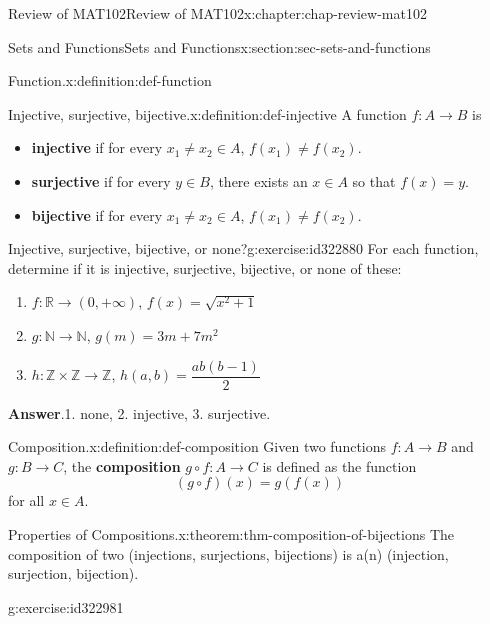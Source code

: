 \documentclass[oneside,10pt,]{book}
\newcommand{\blocktitlefont}{\relax}
\newcommand{\terminology}[1]{\textbf{#1}}
\numberwithin{equation}{section}
\begin{document}
\begin{chapterptx}{Review of MAT102}{}{Review of MAT102}{}{}{x:chapter:chap-review-mat102}
\begin{sectionptx}{Sets and Functions}{}{Sets and Functions}{}{}{x:section:sec-sets-and-functions}
\begin{definition}{Function.}{x:definition:def-function}
\end{definition}
\begin{definition}{Injective, surjective, bijective.}{x:definition:def-injective}%
A function \(f: A \rightarrow B\) is%
\begin{itemize}[label=\textbullet]
\item{}\terminology{injective} if for every \(x_1 \ne x_2 \in A\), \(f(x_1) \ne f(x_2)\).%
\item{}\terminology{surjective} if for every \(y \in B\), there exists an \(x \in A\) so that \(f(x) = y\).%
\item{}\terminology{bijective} if for every \(x_1 \ne x_2 \in A\), \(f(x_1) \ne f(x_2)\).%
\end{itemize}
%
\end{definition}
\begin{inlineexercise}{Injective, surjective, bijective, or none?}{g:exercise:id322880}%
For each function, determine if it is injective, surjective, bijective, or none of these:%
%
\begin{enumerate}[label=(\alph*)]
\item{}\(f: \mathbb{R} \rightarrow (0,+\infty)\), \(f(x) = \sqrt{x^2+1}\)%
\item{}\(g: \mathbb{N} \rightarrow \mathbb{N}\), \(g(m) = 3m + 7m^2\)%
\item{}\(h: \mathbb{Z} \times \mathbb{Z} \rightarrow \mathbb{Z}\), \(h(a,b) = \dfrac{ab(b-1)}{2}\)%
\end{enumerate}
\par\smallskip%
\noindent\textbf{\blocktitlefont Answer}.\hypertarget{g:answer:id322894}{}\quad{}1. none, 2. injective, 3. surjective.%
\end{inlineexercise}
\begin{definition}{Composition.}{x:definition:def-composition}%
\label{g:notation:id322963}%
Given two functions \(f: A \rightarrow B\) and \(g: B \rightarrow C\), the \terminology{composition} \(g \circ f: A \rightarrow C\) is defined as the function%
\begin{equation*}
(g \circ f)(x) = g(f(x))
\end{equation*}
for all \(x \in A\).%
\end{definition}
\begin{theorem}{Properties of Compositions.}{}{x:theorem:thm-composition-of-bijections}%
The composition of two (injections, surjections, bijections) is a(n) (injection, surjection, bijection).%
\end{theorem}
\begin{inlineexercise}{}{g:exercise:id322981}%

\end{inlineexercise}
\end{sectionptx}
\end{chapterptx}
\end{document}
